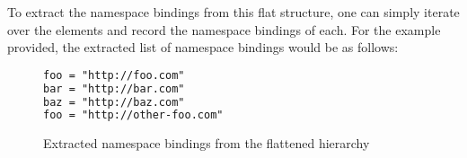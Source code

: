 To extract the namespace bindings from this flat structure,
one can simply iterate over the elements and record the namespace bindings of each.
For the example provided, the extracted list of namespace bindings would be as follows:

\begin{figure}[H]
    \centering
    \caption{Extracted namespace bindings from the flattened hierarchy}
    \label{fig:custom_namespace_notation_example_flattened_extracted}
    \begin{lstlisting}[language=XML, basicstyle=\small\ttfamily]
foo = "http://foo.com"
bar = "http://bar.com"
baz = "http://baz.com"
foo = "http://other-foo.com"
\end{lstlisting}
\end{figure}








